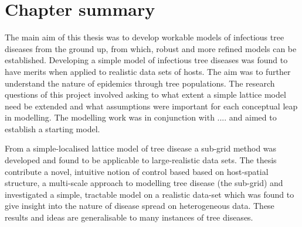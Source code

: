 \section{Chapter summary}


The main aim of this thesis was to develop workable models of infectious tree diseases from the ground up, from which, robust and more refined models can be established. Developing a simple model of infectious tree diseases was found to have merits when applied to realistic data sets of hosts. The aim was to further understand the nature of epidemics through tree populations. The research questions of this project involved asking to what extent a simple lattice model need be extended and what assumptions were important for each conceptual leap in modelling. The modelling work was in conjunction with .... and aimed to establish a starting model.

From a simple-localised lattice model of tree disease a sub-grid method was developed and found to be applicable to large-realistic data sets. The thesis contribute a novel, intuitive notion of control based based on host-spatial structure, a multi-scale approach to modelling tree disease (the sub-grid) and investigated a simple, tractable model on a realistic data-set which was found to give insight into the nature of disease spread on heterogeneous data. These results and ideas are generalisable to many instances of tree diseases.
